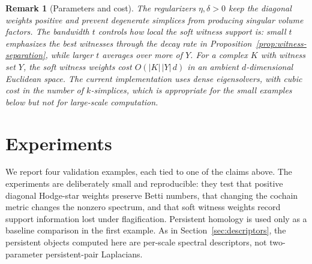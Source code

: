 \documentclass[11pt]{amsart}
\theoremstyle{plain}
\newtheorem{remark}[theorem]{Remark}
\begin{document}
\begin{remark}[Parameters and cost]
The regularizers $\eta,\delta>0$ keep the diagonal weights positive and prevent degenerate
simplices from producing singular volume factors. The bandwidth $t$ controls how local the soft
witness support is: small $t$ emphasizes the best witnesses through the decay rate in
Proposition~\ref{prop:witness-separation}, while larger $t$ averages over more of $Y$. For a
complex $K$ with witness set $Y$, the soft witness weights cost
$O(|K|\,|Y|\,d)$ in an ambient $d$-dimensional Euclidean space. The current implementation uses
dense eigensolvers, with cubic cost in the number of $k$-simplices, which is appropriate for the
small examples below but not for large-scale computation.
\end{remark}

\section{Experiments}
\label{sec:experiments}

We report four validation examples, each tied to one of the claims above. The experiments are
deliberately small and reproducible: they test that positive diagonal Hodge-star weights preserve
Betti numbers, that changing the cochain metric changes the nonzero spectrum, and that soft witness
weights record support information lost under flagification. Persistent homology is used only as a
baseline comparison in the first example. As in Section~\ref{sec:descriptors}, the persistent
objects computed here are per-scale spectral descriptors, not two-parameter persistent-pair
Laplacians.
\end{document}
